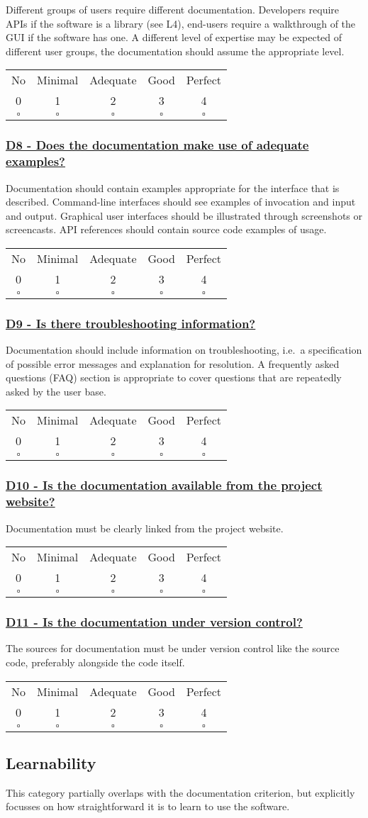 \documentclass[a4paper,11pt]{article}
\newcommand{\criterion}[2]{\subsubsection*{\underline{#1 - #2}}\label{id:#1}}
\newcommand\CheckTable{%
  \begin{tabular}{ccccc}
    No & Minimal & Adequate & Good & Perfect \\
    0 & 1 & 2 & 3 & 4 \\
    \hline
    $\square$ & $\square$ & $\square$ & $\square$ & $\square$ \\
  \end{tabular}%
}
\begin{document}
Different groups of users require different documentation. Developers require
APIs if the software is a library (see L4), end-users require a walkthrough of the GUI
if the software has one. A different level of expertise may be expected of
different user groups, the documentation should assume the appropriate level.

\CheckTable

\newcommand{\dEightID}{D8}
\newcommand{\dEightText}{Does the documentation make use of adequate examples?}
\criterion{\dEightID}{\dEightText}

Documentation should contain examples appropriate for the interface that is
described. Command-line interfaces should see examples of invocation and input
and output. Graphical user interfaces should be illustrated through screenshots or
screencasts. API references should contain source code examples of usage.

\CheckTable

\newcommand{\dNineID}{D9}
\newcommand{\dNineText}{Is there troubleshooting information?}
\criterion{\dNineID}{\dNineText}

Documentation should include information on troubleshooting, i.e.\ a
specification of possible error messages and explanation for resolution. A
frequently asked questions (FAQ) section is appropriate to cover questions
that are repeatedly asked by the user base.

\CheckTable

\newcommand{\dTenID}{D10}
\newcommand{\dTenText}{Is the documentation available from the project website?}
\criterion{\dTenID}{\dTenText}

Documentation must be clearly linked from the project website.

\CheckTable

\newcommand{\dElevenID}{D11}
\newcommand{\dElevenText}{Is the documentation under version control?}
\criterion{\dElevenID}{\dElevenText}

The sources for documentation must be under version control like the source
code, preferably alongside the code itself.

\CheckTable

\subsection{Learnability}\label{sec:lea}

This category partially overlaps with the documentation criterion, but explicitly
focusses on how straightforward it is to learn to use the software.
\end{document}
